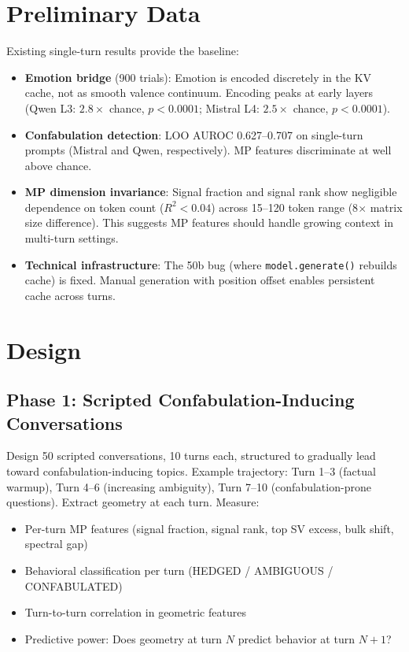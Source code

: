 \documentclass[11pt,letterpaper]{article}
\begin{document}
\section{Preliminary Data}

Existing single-turn results provide the baseline:

\begin{itemize}
  \item \textbf{Emotion bridge} (900 trials): Emotion is encoded
    discretely in the KV cache, not as smooth valence continuum.
    Encoding peaks at early layers (Qwen L3: $2.8\times$ chance,
    $p < 0.0001$; Mistral L4: $2.5\times$ chance, $p < 0.0001$).

  \item \textbf{Confabulation detection}: LOO AUROC 0.627--0.707 on
    single-turn prompts (Mistral and Qwen, respectively). MP features
    discriminate at well above chance.

  \item \textbf{MP dimension invariance}: Signal fraction and signal
    rank show negligible dependence on token count ($R^2 < 0.04$)
    across 15--120 token range (8$\times$ matrix size difference).
    This suggests MP features should handle growing context in
    multi-turn settings.

  \item \textbf{Technical infrastructure}: The 50b bug (where
    \texttt{model.generate()} rebuilds cache) is fixed. Manual
    generation with position offset enables persistent cache across
    turns.
\end{itemize}

\section{Design}

\subsection{Phase 1: Scripted Confabulation-Inducing Conversations}

Design 50 scripted conversations, 10 turns each, structured to
gradually lead toward confabulation-inducing topics. Example
trajectory: Turn 1--3 (factual warmup), Turn 4--6 (increasing
ambiguity), Turn 7--10 (confabulation-prone questions). Extract
geometry at each turn. Measure:

\begin{itemize}
  \item Per-turn MP features (signal fraction, signal rank, top SV
    excess, bulk shift, spectral gap)
  \item Behavioral classification per turn (HEDGED / AMBIGUOUS /
    CONFABULATED)
  \item Turn-to-turn correlation in geometric features
  \item Predictive power: Does geometry at turn $N$ predict behavior
    at turn $N+1$?
\end{itemize}
\end{document}
